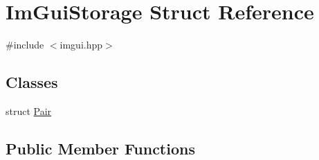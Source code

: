 \hypertarget{struct_im_gui_storage}{}\section{Im\+Gui\+Storage Struct Reference}
\label{struct_im_gui_storage}


{\ttfamily \#include $<$imgui.\+hpp$>$}

\subsection*{Classes}
\begin{DoxyCompactItemize}
\item 
struct \hyperlink{struct_im_gui_storage_1_1_pair}{Pair}
\end{DoxyCompactItemize}
\subsection*{Public Member Functions}
